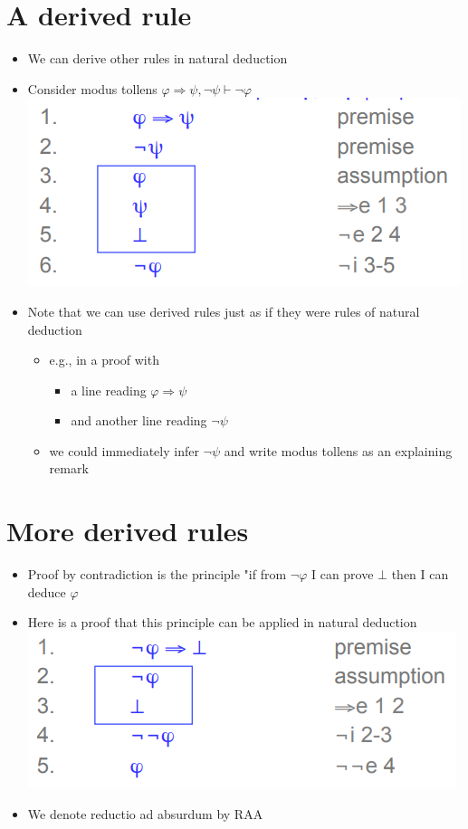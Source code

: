 \documentclass{article}[18pt]
\begin{document}
\section{A derived rule}
\begin{itemize}
	\item We can derive other rules in natural deduction 
	\item Consider modus tollens $\varphi\Rightarrow\psi, \lnot\psi\vdash\lnot\varphi$ \\
	\includegraphics[scale=0.7]{modus_tollens.png}
	\item Note that we can use derived rules just as if they were rules of natural deduction
	\begin{itemize}
		\item e.g., in a proof with
		\begin{itemize}
			\item a line reading $\varphi\Rightarrow\psi$
			\item and another line reading $\lnot\psi$
		\end{itemize}
		\item we could immediately infer $\lnot\psi$ and write modus tollens as an explaining remark
	\end{itemize}
\end{itemize}

\section{More derived rules}
\begin{itemize}
	\item Proof by contradiction is the principle "if from $\lnot\varphi$ I can prove $\bot$ then I can deduce $\varphi$
	\item Here is a proof that this principle can be applied in natural deduction\\
	\includegraphics[scale=0.7]{ProofByContradiction.png}
	\item We denote reductio ad absurdum by RAA
\end{itemize}
\end{document}
